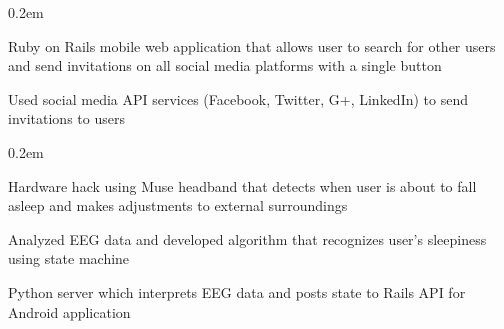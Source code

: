 \documentclass[]{deedy-resume}
\begin{document}
\begin{minipage}[t]{0.66\textwidth}
\begin{tightemize}\itemsep0.2em
\item Ruby on Rails mobile web application that allows user to search for other users and send invitations on all social media platforms with a single button
\item Used social media API services (Facebook, Twitter, G+, LinkedIn) to send invitations to users
\end{tightemize}
\sectionsep

\begin{tightemize}\itemsep0.2em
\item Hardware hack using Muse headband that detects when user is about to fall asleep and makes adjustments to external surroundings
\item Analyzed EEG data and developed algorithm that recognizes user's sleepiness using state machine
\item Python server which interprets EEG data and posts state to Rails API for Android application
\end{tightemize}
\sectionsep

\end{minipage}
\end{document}
